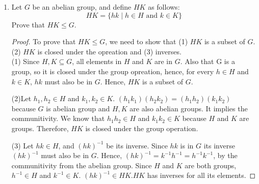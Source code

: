 \documentclass[12pt]{article}
\begin{document}
\begin{enumerate}
\begin{proof}
    \end{proof}
 
    \item Let $G$ be an abelian group, and define $HK$ as follows:
        \[HK = \{hk \mid h \in H \text{  and  } k \in K\}\]
        Prove that $HK \leq G$.
        \begin{proof}
            To prove that $HK \leq G$, we need to show that (1) $HK$ is a subset of $G$.
            (2) $HK$ is closed under the opreation and (3) inverses.\\

            (1) Since $H,K \subseteq G$, all elements in $H$ and $K$ are in $G$. Also that G is a group,
            so it is closed under the group opreation, hence, for every $h \in H$ and $k \in K$, $hk$ must also 
            be in $G$. Hence, $HK$ is a subset of $G$.
            
            (2)Let $h_1, h_2 \in H$ and $k_1,k_2 \in K$. $(h_1k_1)(h_2k_2) = (h_1h_2)(k_1k_2)$ because
            $G$ is abelian group and $H,K$ are also abelian groups. It implies the communitivity. We know that
            $h_1h_2 \in H$ and $k_1k_2 \in K$ because $H$ and $K$ are groups. Therefore, $HK$ is closed under 
            the group operation.

            (3) Let $hk \in H$, and $(hk)^{-1}$ be its inverse. Since $hk$ is in $G$ its inverse $(hk)^{-1}$ must
            also be in $G$. Hence, $(hk)^{-1} = k^{-1} h^{-1} = h^{-1} k^{-1} $, by the communitivity from the abelian group.
            Since $H$ and $K$ are both groups, $h^{-1} \in H$ and $k^{-1} \in K$. $(hk)^{-1} \in HK$.$HK$ has inverses for 
            all its elements.
        \end{proof}
 

\end{enumerate}
\end{document}
